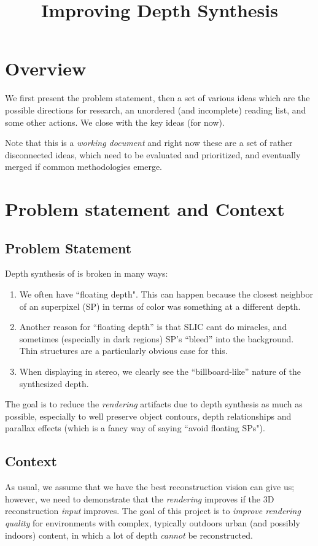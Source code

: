 \documentclass{article}
\begin{document}
\title{Improving Depth Synthesis}
\maketitle


\section{Overview}

We first present the problem statement, then a set of various ideas which
are the possible directions for research, an unordered (and incomplete) reading list,  and some other actions. We close with the key ideas (for now).

Note that this is a \emph{working document} and right now 
these are a set of rather disconnected ideas, which 
need to be evaluated and prioritized, and eventually merged if common
methodologies emerge.

\section{Problem statement and Context}
\label{sec:depth-synth}

\subsection{Problem Statement}
Depth synthesis of \cite{chaurasia13} is broken in many ways:
\begin{enumerate} 
\item We often have ``floating depth". This can happen because the closest neighbor of an superpixel (SP) in terms of color was something at a different depth. 
\item Another reason for ``floating depth'' is that SLIC \cite{slic12} cant do miracles, and sometimes (especially in dark regions) SP's ``bleed'' into the background. Thin structures are a particularly obvious case for this.
\item When displaying in stereo, we clearly see the ``billboard-like'' nature of the synthesized depth.
\end{enumerate}
The goal is to reduce the \emph{rendering} artifacts due to depth synthesis as much as possible, especially
to well preserve object contours, depth relationships and parallax effects (which is a fancy
way of saying ``avoid floating SPs").



\subsection{Context}
\label{sec:context}
As usual, we assume that we have the best reconstruction vision can give us;
however, we need to demonstrate that the \emph{rendering} improves if the 
3D reconstruction \emph{input} improves. 
The goal of this project is to \emph{improve rendering quality}
for environments with complex, typically outdoors urban (and possibly indoors) content, in
which a lot of depth \emph{cannot} be reconstructed.
\end{document}
